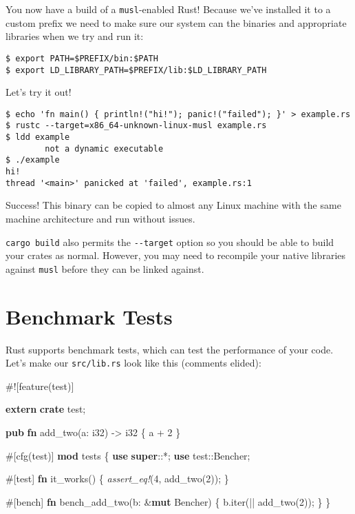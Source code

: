 \documentclass[a4paper,]{book}
\newenvironment{Shaded}{\begin{snugshade}}{\end{snugshade}}
\newcommand{\KeywordTok}[1]{\textcolor[rgb]{0.13,0.29,0.53}{\textbf{{#1}}}}
\newcommand{\DataTypeTok}[1]{\textcolor[rgb]{0.13,0.29,0.53}{{#1}}}
\newcommand{\DecValTok}[1]{\textcolor[rgb]{0.00,0.00,0.81}{{#1}}}
\newcommand{\PreprocessorTok}[1]{\textcolor[rgb]{0.56,0.35,0.01}{\textit{{#1}}}}
\newcommand{\AttributeTok}[1]{\textcolor[rgb]{0.77,0.63,0.00}{{#1}}}
\newcommand{\NormalTok}[1]{{#1}}
\begin{document}
You now have a build of a \texttt{musl}-enabled Rust! Because we've
installed it to a custom prefix we need to make sure our system can the
binaries and appropriate libraries when we try and run it:

\begin{verbatim}
$ export PATH=$PREFIX/bin:$PATH
$ export LD_LIBRARY_PATH=$PREFIX/lib:$LD_LIBRARY_PATH
\end{verbatim}

Let's try it out!

\begin{verbatim}
$ echo 'fn main() { println!("hi!"); panic!("failed"); }' > example.rs
$ rustc --target=x86_64-unknown-linux-musl example.rs
$ ldd example
        not a dynamic executable
$ ./example
hi!
thread '<main>' panicked at 'failed', example.rs:1
\end{verbatim}

Success! This binary can be copied to almost any Linux machine with the
same machine architecture and run without issues.

\texttt{cargo\ build} also permits the \texttt{-\/-target} option so you
should be able to build your crates as normal. However, you may need to
recompile your native libraries against \texttt{musl} before they can be
linked against.

\section{Benchmark Tests}\label{sec--benchmark-tests}

Rust supports benchmark tests, which can test the performance of your
code. Let's make our \texttt{src/lib.rs} look like this (comments
elided):

\begin{Shaded}
\begin{Highlighting}[]
\AttributeTok{#![}\NormalTok{feature}\AttributeTok{(}\NormalTok{test}\AttributeTok{)]}

\KeywordTok{extern} \KeywordTok{crate} \NormalTok{test;}

\KeywordTok{pub} \KeywordTok{fn} \NormalTok{add_two(a: }\DataTypeTok{i32}\NormalTok{) -> }\DataTypeTok{i32} \NormalTok{\{}
    \NormalTok{a + }\DecValTok{2}
\NormalTok{\}}

\AttributeTok{#[}\NormalTok{cfg}\AttributeTok{(}\NormalTok{test}\AttributeTok{)]}
\KeywordTok{mod} \NormalTok{tests \{}
    \KeywordTok{use} \KeywordTok{super}\NormalTok{::*;}
    \KeywordTok{use} \NormalTok{test::Bencher;}

    \AttributeTok{#[}\NormalTok{test}\AttributeTok{]}
    \KeywordTok{fn} \NormalTok{it_works() \{}
        \PreprocessorTok{assert_eq!}\NormalTok{(}\DecValTok{4}\NormalTok{, add_two(}\DecValTok{2}\NormalTok{));}
    \NormalTok{\}}

    \AttributeTok{#[}\NormalTok{bench}\AttributeTok{]}
    \KeywordTok{fn} \NormalTok{bench_add_two(b: &}\KeywordTok{mut} \NormalTok{Bencher) \{}
        \NormalTok{b.iter(|| add_two(}\DecValTok{2}\NormalTok{));}
    \NormalTok{\}}
\NormalTok{\}}
\end{Highlighting}
\end{Shaded}
\end{document}
